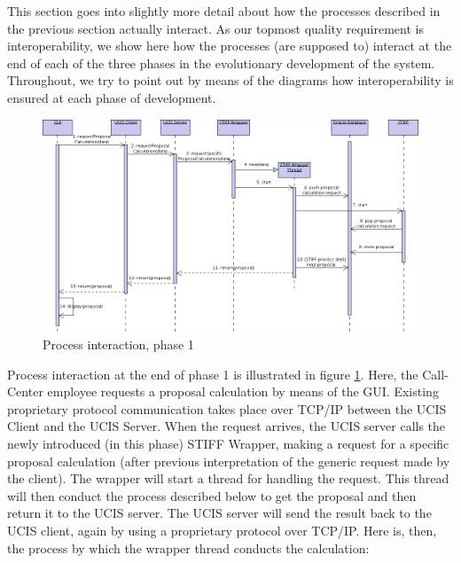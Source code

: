 This section goes into slightly more detail about how the processes described in the previous
section actually interact. As our topmost quality requirement is interoperability, we show here
how the processes (are supposed to) interact at the end of each of the three phases in the evolutionary
development of the system. Throughout, we try to point out by means of the diagrams how
interoperability is ensured at each phase of development.

\begin{figure}[ht]
\begin{center}
\includegraphics[width=\linewidth]{img/pi_1.png}
\end{center}
\caption{Process interaction, phase 1}
\label{fig:pi_1}
\end{figure}

Process interaction at the end of phase 1 is illustrated in figure \ref{fig:pi_1}. Here, the Call-Center
employee requests a proposal calculation by means of the GUI. Existing proprietary protocol
communication takes place over TCP/IP between the UCIS Client and the UCIS Server. When the
request arrives, the UCIS server calls the newly introduced (in this phase) STIFF Wrapper, making
a request for a specific proposal calculation (after previous interpretation of the generic request
made by the client). The wrapper will start a thread for handling the request. This thread will
then conduct the process described below to get the proposal and then return it to the UCIS server.
The UCIS server will send the result back to the UCIS client, again by using a proprietary protocol
over TCP/IP. Here is, then, the process by which the wrapper thread conducts the calculation:

